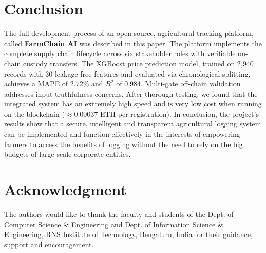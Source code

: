 \documentclass[conference]{IEEEtran}
\begin{document}
\section{Conclusion}
The full development process of an open-source, agricultural tracking platform, called \textbf{FarmChain AI} was described in this paper. The platform implements the complete supply chain lifecycle across six stakeholder roles with verifiable on-chain custody transfers. The XGBoost price prediction model, trained on 2{,}940 records with 30 leakage-free features and evaluated via chronological splitting, achieves a MAPE of 2.72\% and $R^2$ of 0.984. Multi-gate off-chain validation addresses input truthfulness concerns. After thorough testing, we found that the integrated system has an extremely high speed and is very low cost when running on the blockchain ($\approx$0.00037 ETH per registration). In conclusion, the project's results show that a secure, intelligent and transparent agricultural logging system can be implemented and function effectively in the interests of empowering farmers to access the benefits of logging without the need to rely on the big budgets of large-scale corporate entities.

\section*{Acknowledgment}
The authors would like to thank the faculty and students of the Dept. of Computer Science \& Engineering and Dept. of Information Science \& Engineering, RNS Institute of Technology, Bengaluru, India for their guidance, support and encouragement.
\end{document}
